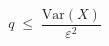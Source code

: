 \documentclass[preview]{standalone}
\begin{document}
\begin{align*}
q \;\leq\; \dfrac{\mathrm{Var}(X)}{\varepsilon^2}
\end{align*}
\end{document}
